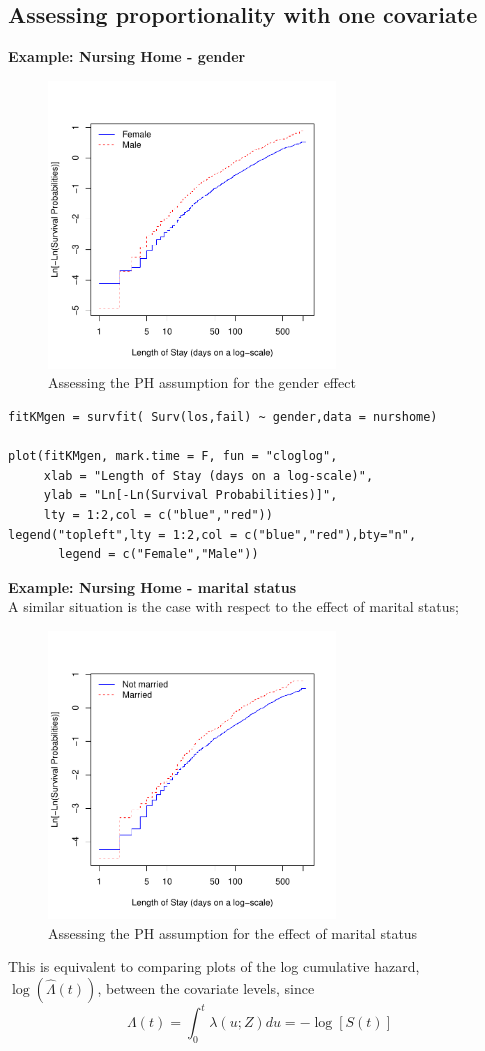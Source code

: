 \documentclass[11pt,psfig]{book}
\begin{document}
\subsection{Assessing proportionality with one covariate}
{\bf Example: Nursing Home - gender}
\small
\begin{figure}[h!]
\caption{Assessing the PH assumption for the gender effect}
\centerline{\includegraphics[width=3in]{ch12ph_sex.pdf}}
\end{figure}
\begin{verbatim}
fitKMgen = survfit( Surv(los,fail) ~ gender,data = nurshome)

plot(fitKMgen, mark.time = F, fun = "cloglog",
     xlab = "Length of Stay (days on a log-scale)", 
     ylab = "Ln[-Ln(Survival Probabilities)]",
     lty = 1:2,col = c("blue","red"))
legend("topleft",lty = 1:2,col = c("blue","red"),bty="n",
       legend = c("Female","Male"))
\end{verbatim}
\normalsize
\noindent
{\bf Example: Nursing Home - marital status}
\\[2ex]
A similar situation is the case with respect to the effect of marital status;
\begin{figure}[htp]
\caption{Assessing the PH assumption for the effect of marital status}
\centerline{\includegraphics[width=3in]{ch12ph_mar_status.pdf}}
\end{figure}
This is equivalent to comparing plots of the log cumulative
hazard, $\log(\hat\Lambda(t))$, between the covariate levels, since
\[ \Lambda(t) =  \int_0^t \lambda(u; Z)du = -\log[S(t)]   \]
\end{document}

